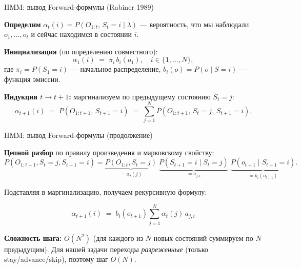 \begin{frame}{HMM: вывод Forward-формулы (Rabiner 1989)}

\textbf{Определим} $\alpha_t(i) = P(O_{1:t},\, S_t = i \mid \lambda)$
--- вероятность, что мы наблюдали $o_1, \ldots, o_t$ и сейчас находимся
в состоянии $i$.

\bigskip

\textbf{Инициализация} (по определению совместного):
\[
\alpha_1(i) \;=\; \pi_i\, b_i(o_1),
\quad i \in \{1, \ldots, N\},
\]
где $\pi_i = P(S_1 = i)$ --- начальное распределение,
$b_i(o) = P(o \mid S=i)$ --- функция эмиссии.

\bigskip

\textbf{Индукция $t \to t+1$:} маргинализуем по предыдущему состоянию
$S_t = j$:
\[
\alpha_{t+1}(i)
\;=\; P(O_{1:t+1},\, S_{t+1}=i)
\;=\; \sum_{j=1}^{N} P(O_{1:t+1},\, S_t = j,\, S_{t+1} = i).
\]

\end{frame}

\begin{frame}{HMM: вывод Forward-формулы (продолжение)}

\textbf{Цепной разбор} по правилу произведения и марковскому свойству:
\small\[
P(O_{1:t+1}, S_t=j, S_{t+1}=i)
= \underbrace{P(O_{1:t}, S_t=j)}_{=\alpha_t(j)}\;
  \underbrace{P(S_{t+1}=i \mid S_t=j)}_{=a_{j,i}}\;
  \underbrace{P(o_{t+1} \mid S_{t+1}=i)}_{=b_i(o_{t+1})}.
\]\normalsize

\bigskip

Подставляя в маргинализацию, получаем рекурсивную формулу:

\bigskip

\[
\boxed{\;
\alpha_{t+1}(i) \;=\; b_i(o_{t+1}) \sum_{j=1}^{N} \alpha_t(j)\, a_{j,i}\;}
\]

\bigskip

\textbf{Сложность шага:} $O(N^2)$ (для каждого из $N$ новых состояний
суммируем по $N$ предыдущим). Для нашей задачи переходы
\emph{разреженные} (только stay/advance/skip), поэтому шаг $O(N)$.

\end{frame}

